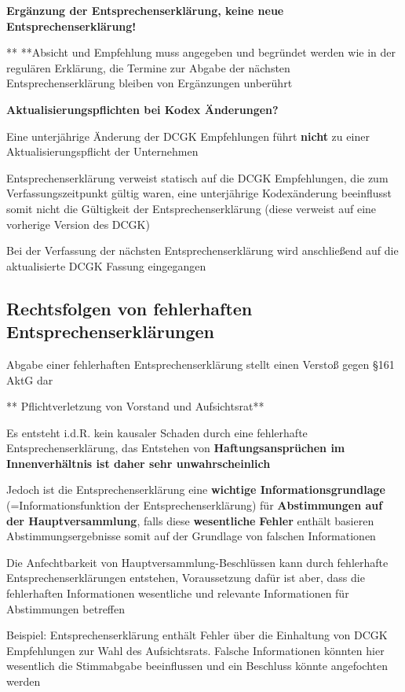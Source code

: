 \documentclass[
]{article}
\begin{document}
\textbf{Ergänzung der Entsprechenserklärung, keine neue
Entsprechenserklärung!}

** **Absicht und Empfehlung muss angegeben und begründet werden wie in
der regulären Erklärung, die Termine zur Abgabe der nächsten
Entsprechenserklärung bleiben von Ergänzungen unberührt

\textbf{Aktualisierungspflichten bei Kodex Änderungen?}

Eine unterjährige Änderung der DCGK Empfehlungen führt \textbf{nicht} zu
einer Aktualisierungspflicht der Unternehmen

Entsprechenserklärung verweist statisch auf die DCGK Empfehlungen, die
zum Verfassungszeitpunkt gültig waren, eine unterjährige Kodexänderung
beeinflusst somit nicht die Gültigkeit der Entsprechenserklärung (diese
verweist auf eine vorherige Version des DCGK)

Bei der Verfassung der nächsten Entsprechenserklärung wird anschließend
auf die aktualisierte DCGK Fassung eingegangen

\hypertarget{rechtsfolgen-von-fehlerhaften-entsprechenserkluxe4rungen}{%
\subsection{Rechtsfolgen von fehlerhaften
Entsprechenserklärungen}\label{rechtsfolgen-von-fehlerhaften-entsprechenserkluxe4rungen}}

Abgabe einer fehlerhaften Entsprechenserklärung stellt einen Verstoß
gegen §161 AktG dar

** Pflichtverletzung von Vorstand und Aufsichtsrat**

Es entsteht i.d.R. kein kausaler Schaden durch eine fehlerhafte
Entsprechenserklärung, das Entstehen von \textbf{Haftungsansprüchen im
Innenverhältnis ist daher sehr unwahrscheinlich}

Jedoch ist die Entsprechenserklärung eine \textbf{wichtige
Informationsgrundlage} (=Informationsfunktion der Entsprechenserklärung)
für \textbf{Abstimmungen auf der Hauptversammlung}, falls diese
\textbf{wesentliche} \textbf{Fehler} enthält basieren
Abstimmungsergebnisse somit auf der Grundlage von falschen Informationen

Die Anfechtbarkeit von Hauptversammlung-Beschlüssen kann durch
fehlerhafte Entsprechenserklärungen entstehen, Voraussetzung dafür ist
aber, dass die fehlerhaften Informationen wesentliche und relevante
Informationen für Abstimmungen betreffen

Beispiel: Entsprechenserklärung enthält Fehler über die Einhaltung von
DCGK Empfehlungen zur Wahl des Aufsichtsrats. Falsche Informationen
könnten hier wesentlich die Stimmabgabe beeinflussen und ein Beschluss
könnte angefochten werden
\end{document}
